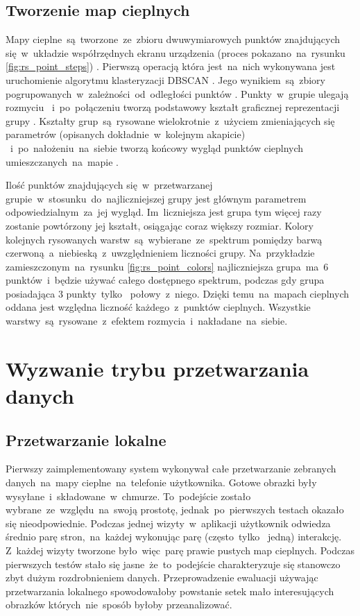 \subsection{Tworzenie map cieplnych}
Mapy cieplne~są~tworzone~ze~zbioru dwuwymiarowych punktów znajdujących się~w~układzie współrzędnych ekranu urządzenia (proces pokazano~na~rysunku \ref{fig:rs_point_steps}) . Pierwszą operacją która jest~na~nich wykonywana jest uruchomienie algorytmu klasteryzacji DBSCAN \cite{DBSCAN_Wiki}. Jego wynikiem~są~zbiory pogrupowanych~w~zależności~od~odległości punktów . Punkty~w~grupie ulegają rozmyciu ~i~po~połączeniu tworzą podstawowy kształt graficznej reprezentacji grupy . Kształty grup~są~rysowane wielokrotnie~z~użyciem zmieniających się parametrów (opisanych dokładnie~w~kolejnym akapicie) ~i~po~nałożeniu~na~siebie tworzą końcowy wygląd punktów cieplnych umieszczanych~na~mapie .


Ilość punktów znajdujących się~w~przetwarzanej grupie~w~stosunku~do~najliczniejszej grupy jest głównym parametrem odpowiedzialnym~za~jej wygląd. Im~liczniejsza jest grupa tym więcej razy zostanie powtórzony jej kształt, osiągając coraz większy rozmiar. Kolory kolejnych rysowanych warstw~są~wybierane~ze~spektrum pomiędzy barwą czerwoną~a~niebieską~z~uwzględnieniem liczności grupy. Na~przykładzie zamieszczonym~na~rysunku \ref{fig:rs_point_colors} najliczniejsza grupa~ma~$6$ punktów~i~będzie używać całego dostępnego spektrum, podczas gdy grupa posiadająca $3$ punkty~tylko~ połowy~z~niego. Dzięki temu~na~mapach cieplnych oddana jest względna liczność każdego~z~punktów cieplnych. Wszystkie warstwy~są~rysowane~z~efektem rozmycia~i~nakładane~na~siebie. 

\bigskip
{}

\section{Wyzwanie trybu przetwarzania danych}

\subsection{Przetwarzanie lokalne}
Pierwszy zaimplementowany system wykonywał całe przetwarzanie zebranych danych~na~mapy cieplne~na~telefonie użytkownika. Gotowe obrazki były wysyłane~i~składowane~w~chmurze. To~podejście zostało wybrane~ze~względu~na~swoją prostotę, jednak~po~pierwszych testach okazało się nieodpowiednie. Podczas jednej wizyty~w~aplikacji  użytkownik odwiedza średnio parę stron,~na~każdej wykonując parę (często~tylko~ jedną) interakcję. Z~każdej wizyty tworzone było~więc~parę prawie pustych map cieplnych. Podczas pierwszych testów stało się jasne~że~to~podejście charakteryzuje się stanowczo zbyt dużym rozdrobnieniem danych. Przeprowadzenie ewaluacji używając przetwarzania lokalnego spowodowałoby powstanie setek mało interesujących obrazków których~nie~sposób byłoby przeanalizować.

